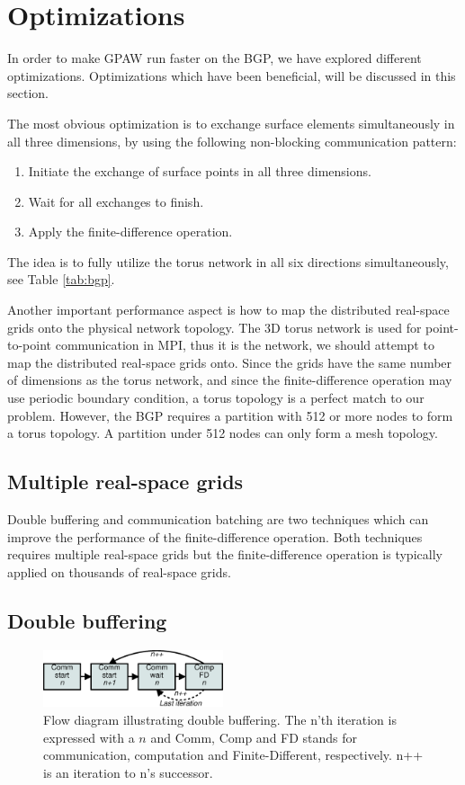 \documentclass[conference]{IEEEtran}
\begin{document}
\section{Optimizations}\label{section:opt}
In order to make GPAW run faster on the BGP, we have explored different optimizations. Optimizations which have been beneficial, will be discussed in this section.

The most obvious optimization is to exchange surface elements simultaneously in all three dimensions, by using the following non-blocking communication pattern:
\begin{enumerate}
 \item Initiate the exchange of surface points in all three dimensions.
 \item Wait for all exchanges to finish.
 \item Apply the finite-difference operation.
\end{enumerate}
The idea is to fully utilize the torus network in all six directions simultaneously, see Table \ref{tab:bgp}.

Another important performance aspect is how to map the distributed real-space grids onto the physical network topology. The 3D torus network is used for point-to-point communication in MPI, thus it is the network, we should attempt to map the distributed real-space grids onto. Since the grids have the same number of dimensions as the torus network, and since the finite-difference operation may use periodic boundary condition, a torus topology is a perfect match to our problem. However, the BGP requires a partition with 512 or more nodes to form a torus topology. A partition under 512 nodes can only form a mesh topology.

\subsection{Multiple real-space grids}
Double buffering and communication batching are two techniques which can improve the performance of the finite-difference operation. Both techniques requires multiple real-space grids but the finite-difference operation is typically applied on thousands of real-space grids.

\subsection*{Double buffering}

\begin{figure}
 \centering
 \includegraphics[width=200px]{gfx/commflow}
 \caption{Flow diagram illustrating double buffering. The n'th iteration is expressed with a $n$ and Comm, Comp and FD stands for communication, computation and Finite-Different, respectively. n++ is an iteration to n's successor.}
 \label{fig:commflow}
\end{figure}
\end{document}
